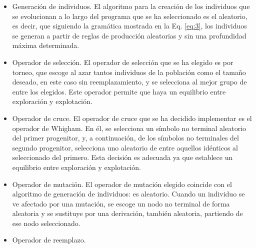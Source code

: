 \documentclass[spanish,a4paper,12pt,twoside]{report}
\begin{document}
  \begin{itemize}
    \item Generación de individuos. El algoritmo para la creación de los individuos que se evolucionan a lo largo del programa que se ha seleccionado es el aleatorio, es decir, que siguiendo la gramática mostrada en la Eq. \ref{eq:3}, los individuos se generan a partir de reglas de producción aleatorias y sin una profundidad máxima determinada.
    \item Operador de selección. El operador de selección que se ha elegido es por torneo, que escoge al azar tantos individuos de la población como el tamaño deseado, en este caso sin reemplazamiento, y se selecciona al mejor grupo de entre los elegidos. Este operador permite que haya un equilibrio entre exploración y explotación.
    \item Operador de cruce. El operador de cruce que se ha decidido implementar es el operador de Whigham. En él, se selecciona un símbolo no terminal aleatorio del primer progenitor, y, a continuación, de los símbolos no terminales del segundo progenitor, selecciona uno aleatorio de entre aquellos idénticos al seleccionado del primero. Esta decisión es adecuada ya que establece un equilibrio entre exploración y explotación.
    \item Operador de mutación. El operador de mutación elegido coincide con el algoritmo de generación de individuos: es aleatorio. Cuando un individuo se ve afectado por una mutación, se escoge un nodo no terminal de forma aleatoria y se sustituye por una derivación, también aleatoria, partiendo de ese nodo seleccionado.
    \item Operador de reemplazo.
    
  \end{itemize}
  
  \chapter{\vspace{-3cm}{\LARGE 7. Resultados}}
  
  \chapter{\vspace{-3cm}{\LARGE 8. Conclusiones y líneas futuras}}
  \vfill
  
\end{document}
